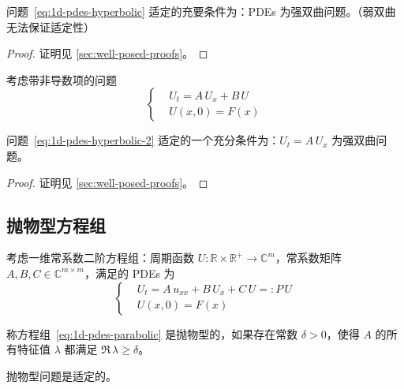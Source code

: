 \begin{theorem}\label{thm:well-posed-2}
    问题~\eqref{eq:1d-pdes-hyperbolic} 适定的充要条件为：PDEs 为强双曲问题。（弱双曲无法保证适定性）
\end{theorem}

\begin{proof}
    证明见 \ref{sec:well-posed-proofs}。
\end{proof}

考虑带非导数项的问题
\begin{equation}
    \left\{
    \begin{aligned}
         & U_t = A\,U_x  + B\,U \\
         & U(x,0) = F(x)
    \end{aligned}
    \right.
    \label{eq:1d-pdes-hyperbolic-2}
\end{equation}

\begin{theorem}\label{thm:well-posed-3}
    问题~\eqref{eq:1d-pdes-hyperbolic-2} 适定的一个充分条件为：$U_t = A\,U_x$ 为强双曲问题。
\end{theorem}

\begin{proof}
    证明见 \ref{sec:well-posed-proofs}。
\end{proof}

\subsection{抛物型方程组}


考虑一维常系数二阶方程组：周期函数 $U: \mathbb{R} \times \mathbb{R}^+ \to \mathbb{C}^{m}$，常系数矩阵 $A,B,C \in \mathbb{C}^{m \times m}$，满足的 PDEs 为
\begin{equation}
    \left\{
    \begin{aligned}
         & U_t = A\,u_{xx} + B\,U_x + C\,U =: P\,U \\
         & U(x,0) = F(x)
    \end{aligned}
    \right.
    \label{eq:1d-pdes-parabolic}
\end{equation}

\begin{definition}
    称方程组~\eqref{eq:1d-pdes-parabolic} 是抛物型的，如果存在常数 $\delta > 0$，使得 $A$ 的所有特征值 $\lambda$ 都满足 $\Re\, \lambda \ge \delta$。
\end{definition}


\begin{theorem}\label{thm:well-posed-4}
    抛物型问题是适定的。
\end{theorem}

